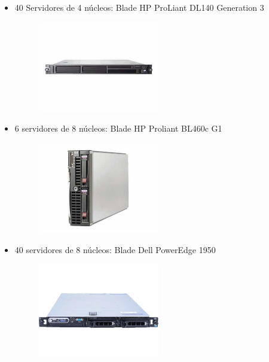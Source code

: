 \begin{itemize}
	\item 40 Servidores de 4 núcleos: Blade HP ProLiant DL140 Generation 3\cite{techDL140}

	\begin{figure}[H]
		\centering
		\includegraphics[width=0.5\textwidth]{aux/apolo}
		\caption[Blad HProLiant DL140]{}
	\end{figure}
	
 	
	\item  6 servidores de 8 núcleos: Blade HP Proliant BL460c G1\cite{techBL460}


	\begin{figure}[H]
		\centering
		\includegraphics[width=0.5\textwidth]{aux/Aguadas}
		\caption[Blade HP BL460]{}
	\end{figure}
	

	\item 40  servidores de 8 núcleos: Blade Dell PowerEdge 1950\cite{teckDell1950}

	\begin{figure}[H]
		\centering
		\includegraphics[width=0.5\textwidth]{aux/1950}
		\caption[Blade Dell PowerEdge 1950]{}
	\end{figure}
	

\end{itemize}


